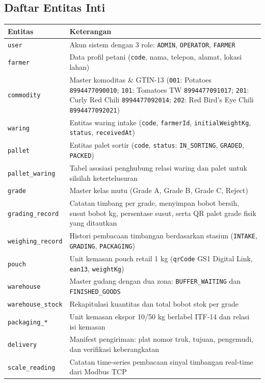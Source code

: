 \documentclass[12pt,a4paper]{article}
\begin{document}
\subsection{Daftar Entitas Inti}
\begin{longtable}{@{}>{\raggedright\arraybackslash}p{3.2cm}>{\raggedright\arraybackslash}p{11.0cm}@{}}
\toprule
\textbf{Entitas} & \textbf{Keterangan} \\
\midrule
\endhead
\texttt{user} & Akun sistem dengan 3 role: \texttt{ADMIN}, \texttt{OPERATOR}, \texttt{FARMER} \\
\texttt{farmer} & Data profil petani (\texttt{code}, nama, telepon, alamat, lokasi lahan) \\
\texttt{commodity} & Master komoditas \& GTIN-13 (\texttt{001}: Potatoes \texttt{8994477090010}; \texttt{101}: Tomatoes TW \texttt{8994477091017}; \texttt{201}: Curly Red Chili \texttt{8994477092014}; \texttt{202}: Red Bird's Eye Chili \texttt{8994477092021}) \\
\texttt{waring} & Entitas waring intake (\texttt{code}, \texttt{farmerId}, \texttt{initialWeightKg}, \texttt{status}, \texttt{receivedAt}) \\
\texttt{pallet} & Entitas palet sortir (\texttt{code}, \texttt{status}: \texttt{IN\_SORTING}, \texttt{GRADED}, \texttt{PACKED}) \\
\texttt{pallet\_waring} & Tabel asosiasi penghubung relasi waring dan palet untuk silsilah ketertelusuran \\
\texttt{grade} & Master kelas mutu (Grade A, Grade B, Grade C, Reject) \\
\texttt{grading\_record} & Catatan timbang per grade, menyimpan bobot bersih, susut bobot kg, persentase susut, serta QR palet grade fisik yang ditautkan \\
\texttt{weighing\_record} & Histori pembacaan timbangan berdasarkan stasiun (\texttt{INTAKE}, \texttt{GRADING}, \texttt{PACKAGING}) \\
\texttt{pouch} & Unit kemasan pouch retail 1 kg (\texttt{qrCode} GS1 Digital Link, \texttt{ean13}, \texttt{weightKg}) \\
\texttt{warehouse} & Master gudang dengan dua zona: \texttt{BUFFER\_WAITING} dan \texttt{FINISHED\_GOODS} \\
\texttt{warehouse\_stock} & Rekapitulasi kuantitas dan total bobot stok per grade \\
\texttt{packaging\_*} & Unit kemasan ekspor 10/50 kg berlabel ITF-14 dan relasi isi kemasan \\
\texttt{delivery} & Manifest pengiriman: plat nomor truk, tujuan, pengemudi, dan verifikasi keberangkatan \\
\texttt{scale\_reading} & Catatan time-series pembacaan sinyal timbangan real-time dari Modbus TCP \\
\bottomrule
\end{longtable}
\end{document}
